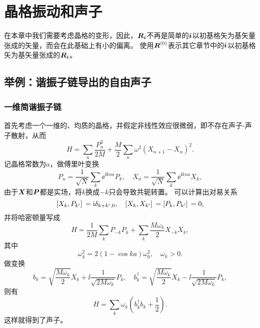 \chapter{晶格振动和声子}\label{chap:phonon}

在本章中我们需要考虑晶格的变形，因此，$\vb*{R}_{\vb*{i}}$不再是简单的$\vb*{i}$以初基格矢为基矢量张成的矢量，而会在此基础上有小的偏离。
使用$\vb*{R}^{(0)}$表示其它章节中的$\vb*{i}$以初基格矢为基矢量张成的$\vb*{R}_{\vb*{i}}$。

\section{举例：谐振子链导出的自由声子}

\subsection{一维简谐振子链}

首先考虑一个一维的、均质的晶格，并假定非线性效应很微弱，即不存在声子-声子散射，从而
\begin{equation}
    {H} = \sum_n \frac{{P}_n^2}{2 M} + \frac{M}{2} \sum_{n} \omega^2 ({X}_{n+1} - {X}_{n})^2.
    \label{eq:one-dim-osc-hamiltonian}
\end{equation}
记晶格常数为$a$，做傅里叶变换
\[
    {P}_n = \frac{1}{\sqrt{N}} \sum_{k} \ee^{\ii k n a} {P}_k, \quad {X}_n = \frac{1}{\sqrt{N}} \sum_{k} \ee^{\ii k n a} {X}_k,
\]
由于$\vb*{X}$和$\vb*{P}$都是实场，将$k$换成$-k$只会导致共轭转置。
可以计算出对易关系
\begin{equation}
    \comm*{{X}_{k}}{{P}_{k'}} = \ii \delta_{k+k', 0}, \quad \comm*{{X}_{k}}{{X}_{k'}} = \comm*{{P}_{k}}{{P}_{k'}} = 0,
\end{equation}
并将哈密顿量写成
\[
    {H} = \frac{1}{2M} \sum_{k} {P}_{-k} {P}_{k} + \sum_k \frac{M \omega_{k}}{2} {X}_{-k} {X}_k,
\]
其中
\begin{equation}
    \omega_k^2 = 2 (1 - \cos k a) \omega_0^2, \quad \omega_k > 0.
\end{equation}
做变换
\begin{equation}
    {b}_{k} = \sqrt{\frac{M \omega_k}{2}} {X}_k + \ii \frac{1}{\sqrt{2 M \omega_k}} P_k, \quad {b}^\dagger_{k} = \sqrt{\frac{M \omega_k}{2}} {X}_k - \ii \frac{1}{\sqrt{2 M \omega_k}} P_k,
\end{equation}
则有
\begin{equation}
    {H} = \sum_k \omega_k \left({b}^\dagger_k {b}_k + \frac{1}{2}\right).
    \label{eq:1d-phonon-ham}
\end{equation}
这样就得到了声子。

